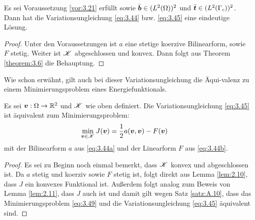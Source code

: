 \begin{theorem}\label{theorem:3.22}
Es sei Voraussetzung \ref{vor:3.21} erfüllt sowie $\bar{\boldsymbol b}  \in (L^2(\Omega))^2$ und $\bar{\boldsymbol t} \in (L^2(\Gamma_c))^2$. Dann hat die Variationsungleichung \eqref{eq:3.44} bzw. \eqref{eq:3.45} eine eindeutige Lösung.
\end{theorem}

\begin{proof}
Unter den Voraussetzungen ist $a$ eine stetige koerzive Bilinearform, sowie $F$ stetig. Weiter ist $\mathscr K$ abgeschlossen und konvex. Dann folgt aus Theorem \ref{theorem:3.6} die Behauptung.
\end{proof}


Wie schon erwähnt, gilt auch bei dieser Variationsungleichung die Äqui-valenz zu einem Minimierungsproblem eines Energiefunktionals. 


\begin{theorem}\label{theorem:3.23}
Es sei $\boldsymbol v : \Omega \rightarrow \mathbb{R}^2$ und $\mathscr K$ wie oben definiert. Die Variationsungleichung \eqref{eq:3.45} ist äquivalent zum Minimierungsproblem:
\begin{align}\label{eq:3.49}
	\min_{\boldsymbol v \in \mathscr K} J(\boldsymbol v)& = \frac 1 2 a(\boldsymbol v, \boldsymbol v)-F(\boldsymbol v)
\end{align}
mit der Bilinearform $a$ aus \eqref{eq:3.44a} und der Linearform $F$ aus \eqref{eq:3.44b}.
\end{theorem}

\begin{proof}
Es sei zu Beginn noch einmal bemerkt, dass $\mathscr K$ konvex und abgeschlossen ist. Da $a$ stetig und koerziv sowie $F$ stetig ist, folgt direkt aus Lemma \ref{lem:2.10}, dass $J$ ein konvexes Funktional ist. Außerdem folgt analog zum Beweis von Lemma \ref{lem:2.11}, dass $J$ auch  ist und damit gilt wegen Satz \ref{satz:A.10}, dass das Minimierungsproblem \eqref{eq:3.49} und die Variationsungleichung \eqref{eq:3.45} äquivalent sind.
\end{proof}


